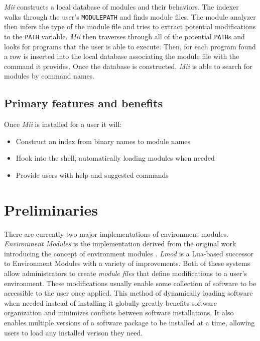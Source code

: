 \documentclass[manuscript,screen]{acmart}
\begin{document}
\par

\textit{Mii} constructs a local database of modules and their behaviors. The indexer walks through the user’s
\texttt{MODULEPATH} and finds module files. The module analyzer then infers the type of the module file and tries to
extract potential modifications to the \texttt{PATH} variable. \textit{Mii} then traverses through all of the potential \texttt{PATH}s
and looks for programs that the user is able to execute. Then, for each program found a row is inserted
into the local database associating the module file with the command it provides. Once the database is
constructed, \textit{Mii} is able to search for modules by command names.

\subsection{Primary features and benefits}

Once \textit{Mii} is installed for a user it will:
\begin{itemize}
\item Construct an index from binary names to module names
\item Hook into the shell, automatically loading modules when needed
\item Provide users with help and suggested commands
\end{itemize}

\section{Preliminaries}

There are currently two major implementations of environment modules. \textit{Environment Modules} \cite{TclPage} is
the implementation derived from the original work introducing the concept of environment modules \cite{TclPaper}.
\textit{Lmod} \cite{LmodPage} is a Lua-based successor to Environment Modules with a variety of improvements. Both of these
systems allow administrators to create \textit{module files} that define modifications to a user’s environment. These
modifications usually enable some collection of software to be accessible to the user once applied. This
method of dynamically loading software when needed instead of installing it globally greatly benefits software
organization and minimizes conflicts between software installations. It also enables multiple versions of a
software package to be installed at a time, allowing users to load any installed verison they need.
\end{document}
